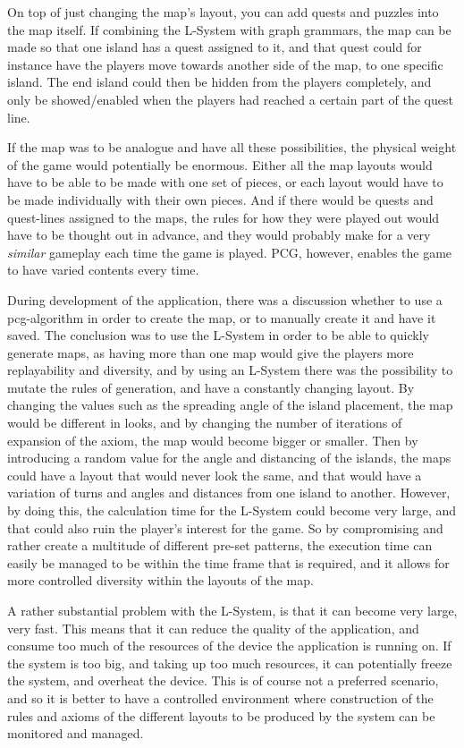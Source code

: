 On top of just changing the map's layout, you can add quests and puzzles into the map itself. If combining the L-System with graph grammars, the map can be made so that one island has a quest assigned to it, and that quest could for instance have the players move towards another side of the map, to one specific island. The end island could then be hidden from the players completely, and only be showed/enabled when the players had reached a certain part of the quest line.

If the map was to be analogue and have all these possibilities, the physical weight of the game would potentially be enormous. Either all the map layouts would have to be able to be made with one set of pieces, or each layout would have to be made individually with their own pieces. And if there would be quests and quest-lines assigned to the maps, the rules for how they were played out would have to be thought out in advance, and they would probably make for a very \textit{similar} gameplay each time the game is played. PCG, however, enables the game to have varied contents every time.

During development of the application, there was a discussion whether to use a pcg-algorithm in order to create the map, or to manually create it and have it saved. The conclusion was to use the L-System in order to be able to quickly generate maps, as having more than one map would give the players more replayability and diversity, and by using an L-System there was the possibility to mutate the rules of generation, and have a constantly changing layout. By changing the values such as the spreading angle of the island placement, the map would be different in looks, and by changing the number of iterations of expansion of the axiom, the map would become bigger or smaller. Then by introducing a random value for the angle and distancing of the islands, the maps could have a layout that would never look the same, and that would have a variation of turns and angles and distances from one island to another. However, by doing this, the calculation time for the L-System could become very large, and that could also ruin the player's interest for the game. So by compromising and rather create a multitude of different pre-set patterns, the execution time can easily be managed to be within the time frame that is required, and it allows for more controlled diversity within the layouts of the map.

A rather substantial problem with the L-System, is that it can become very large, very fast. This means that it can reduce the quality of the application, and consume too much of the resources of the device the application is running on. If the system is too big, and taking up too much resources, it can potentially freeze the system, and overheat the device. This is of course not a preferred scenario, and so it is better to have a controlled environment where construction of the rules and axioms of the different layouts to be produced by the system can be monitored and managed.

